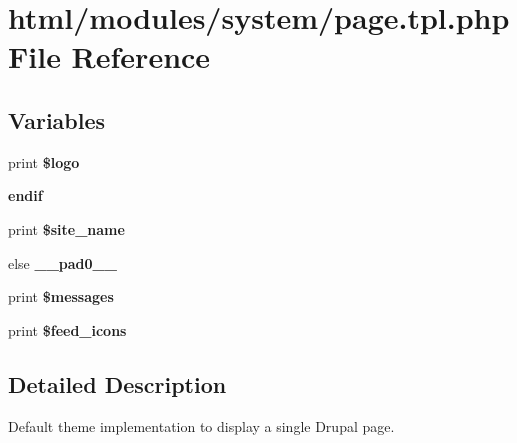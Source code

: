 \hypertarget{modules_2system_2page_8tpl_8php}{
\section{html/modules/system/page.tpl.php File Reference}
\label{modules_2system_2page_8tpl_8php}
}
\subsection*{Variables}
\begin{DoxyCompactItemize}
\item 
\hypertarget{modules_2system_2page_8tpl_8php_a0fa695c12e5240657bb07a7742cf8391}{
print {\bfseries \$logo}}
\label{modules_2system_2page_8tpl_8php_a0fa695c12e5240657bb07a7742cf8391}

\item 
\hypertarget{modules_2system_2page_8tpl_8php_a82cd33ca97ff99f2fcc5e9c81d65251b}{
{\bfseries endif}}
\label{modules_2system_2page_8tpl_8php_a82cd33ca97ff99f2fcc5e9c81d65251b}

\item 
\hypertarget{modules_2system_2page_8tpl_8php_ad500e3900e86a2e78f15afbe44b1f849}{
print {\bfseries \$site\_\-name}}
\label{modules_2system_2page_8tpl_8php_ad500e3900e86a2e78f15afbe44b1f849}

\item 
\hypertarget{modules_2system_2page_8tpl_8php_a8e01dcc96c43199448ee66f7c2ae8ea6}{
else {\bfseries \_\-\_\-pad0\_\-\_\-}}
\label{modules_2system_2page_8tpl_8php_a8e01dcc96c43199448ee66f7c2ae8ea6}

\item 
\hypertarget{modules_2system_2page_8tpl_8php_a563294b2ecdb9ce8d9f8d20f680b5592}{
print {\bfseries \$messages}}
\label{modules_2system_2page_8tpl_8php_a563294b2ecdb9ce8d9f8d20f680b5592}

\item 
\hypertarget{modules_2system_2page_8tpl_8php_ab467b853777a9bfda790f67537c97eca}{
print {\bfseries \$feed\_\-icons}}
\label{modules_2system_2page_8tpl_8php_ab467b853777a9bfda790f67537c97eca}

\end{DoxyCompactItemize}


\subsection{Detailed Description}
Default theme implementation to display a single Drupal page.

